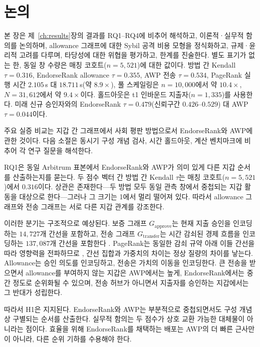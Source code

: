 ﻿%
\chapter{논의}
\label{ch:discussion}

본 장은 제~\ref{ch:results}장의 결과를 RQ1--RQ4에 비추어 해석하고, 이론적·실무적 함의를 논의하며, allowance 그래프에 대한 Sybil 공격 비용 모형을 정식화하고, 규제·윤리적 고려를 다루며, 타당성에 대한 위협을 평가하고, 한계를 진술한다. 별도 표기가 없는 한, 동일 창 수량은 매칭 코호트($n=5{,}521$)에 대한 값이다. 방법 간 Kendall $\tau=0.316$, EndorseRank allowance $\tau=0.355$, AWP 전송 $\tau=0.534$, PageRank 실행 시간 $2.105$\,s 대 $18.711$\,s(약 $8.9\times$), 풀 스케일링은 $n=10{,}000$에서 약 $10.4\times$, $N=31{,}612$에서 약 $9.4\times$이다. 홀드아웃은 t1 인바운드 지출자($n=1{,}335$)를 사용한다. 미래 신규 승인자와의 EndorseRank $\tau=0.479$(신뢰구간 $0.426$--$0.529$) 대 AWP $\tau=0.044$이다.


주요 실증 비교는 지갑 간 그래프에서 사회 평판 방법으로서 EndorseRank와 AWP에 관한 것이다. 다음 소절은 동시기 구성 개념 검사, 시간 홀드아웃, 계산 벤치마크에 비추어 각 연구 질문을 해석한다.


RQ1은 동일 Arbitrum 표본에서 EndorseRank와 AWP가 의미 있게 다른 지갑 순서를 산출하는지를 묻는다. 두 점수 벡터 간 방법 간 Kendall $\tau$는 매칭 코호트($n=5{,}521$)에서 $0.316$이다. 상관은 존재한다---두 방법 모두 동일 관측 창에서 중첩되는 지갑 활동을 대상으로 한다---그러나 그 크기는 1에서 멀리 떨어져 있다. 따라서 allowance 그래프와 전송 그래프는 서로 다른 지갑 관계를 강조한다.

이러한 분기는 구조적으로 예상된다. 보증 그래프 $G_{\text{approve}}$는 현재 지출 승인을 인코딩하는 $14{,}727$개 간선을 포함하고, 전송 그래프 $G_{\text{transfer}}$는 시간 감쇠된 경제 흐름을 인코딩하는 $137{,}087$개 간선을 포함한다 . PageRank는 동일한 감쇠 규약 아래 이들 간선을 따라 영향력을 전파하므로 , 간선 집합과 가중치의 차이는 정상 질량의 차이를 낳는다. Allowance는 승인 의도를 인코딩하고, 전송은 가치의 이동을 인코딩한다. 큰 전송을 받으면서 allowance를 부여하지 않는 지갑은 AWP에서는 높게, EndorseRank에서는 중간 정도로 순위화될 수 있으며, 전송 허브가 아니면서 지출자를 승인하는 지갑에서는 그 반대가 성립한다.

따라서 H1은 지지된다. EndorseRank와 AWP는 부분적으로 중첩되면서도 구성 개념상 구별되는 순서를 산출한다. 실무적 함의는 두 점수가 상호 교환 가능한 대체물이 아니라는 점이다. 효율을 위해 EndorseRank를 채택하는 배포는 AWP의 더 빠른 근사만이 아니라, 다른 순위 기하를 수용해야 한다.

